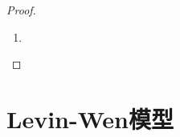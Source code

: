 \documentclass[TQFT_main]{subfiles}
\begin{document}
\begin{proof}
    \begin{enumerate}
        \item 
    \end{enumerate}
    
\end{proof}


\section{Levin-Wen模型}
\end{document}
